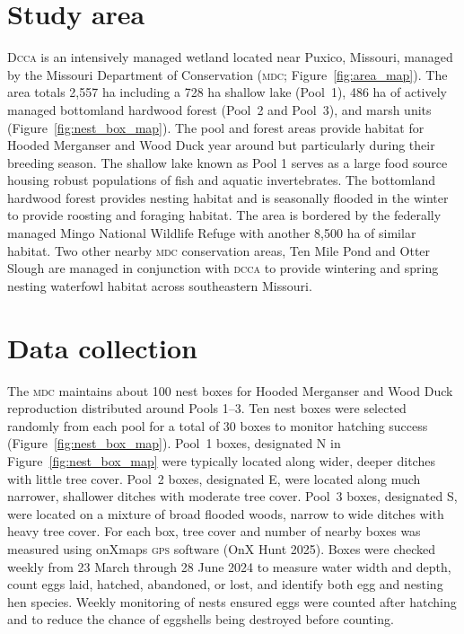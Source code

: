 
\section*{Study area}

D\textsc{cca} is an intensively managed wetland located near Puxico, Missouri, managed by the Missouri Department of Conservation (\textsc{mdc}; Figure~\ref{fig:area_map}). The area totals 2,557 ha including a 728 ha shallow lake (Pool~1), 486 ha of actively managed bottomland hardwood forest (Pool~2 and Pool~3), and marsh units (Figure~\ref{fig:nest_box_map}). The pool and forest areas provide habitat for Hooded Merganser and Wood Duck year around but particularly during their breeding season. The shallow lake known as Pool 1 serves as a large food source housing robust populations of fish and aquatic invertebrates. The bottomland hardwood forest provides nesting habitat and is seasonally flooded in the winter to provide roosting and foraging habitat. The area is bordered by the federally managed Mingo National Wildlife Refuge with another 8,500 ha of similar habitat.  Two other nearby \textsc{mdc} conservation areas, Ten Mile Pond and Otter Slough are managed in conjunction with \textsc{dcca} to provide wintering and spring nesting waterfowl habitat across southeastern Missouri. 

 


\section*{Data collection}

The \textsc{mdc} maintains about 100 nest boxes for Hooded Merganser and Wood Duck reproduction distributed around Pools 1–3.  Ten nest boxes were selected randomly from each pool for a total of 30 boxes to monitor hatching success (Figure~\ref{fig:nest_box_map}).  Pool~1 boxes, designated N in Figure~\ref{fig:nest_box_map} were typically located along wider, deeper ditches with little tree cover. Pool~2 boxes, designated E, were located along much narrower, shallower ditches with moderate tree cover. Pool~3 boxes, designated S, were located on a mixture of broad flooded woods, narrow to wide ditches with heavy tree cover. For each box, tree cover and number of nearby boxes was measured using onXmaps \textsc{gps} software (OnX Hunt 2025). Boxes were checked weekly from 23 March through 28 June 2024 to measure water width and depth, count eggs laid, hatched, abandoned, or lost, and identify both egg and nesting hen species. Weekly monitoring of nests ensured eggs were counted after hatching and to reduce the chance of eggshells being destroyed before counting. 

